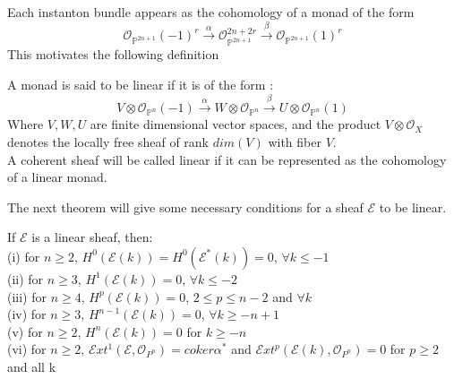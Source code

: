 \documentclass[
	oldfontcommands,
	sumario=abnt-6027-2012,
	12pt,			%
	openright,		%
	oneside,		%
	a4paper,		%
	english,		%
	brazil			%
	]{imecc-unicamp}
\begin{document}
Each instanton bundle appears as the cohomology of a monad of the form
\begin{equation}
\mathcal{O}_{\mathbb{P}^{2n+1}}(-1)^r \overset{ \alpha}{\to} \mathcal{O}_{\mathbb{P}^{2n+1}}^{2n+2r} \overset{ \beta}{\to}  \mathcal{O}_{\mathbb{P}^{2n+1}}(1)^r
\end{equation}
This motivates the following definition
\begin{definition}\cite[Jardim]{jardim}
A monad is said to be linear if it is of the form :
\begin{equation}
V \otimes \mathcal{O}_{\mathbb{P}^n}(-1) \overset{ \alpha}{\to} W \otimes \mathcal{O}_{\mathbb{P}^n} \overset{ \beta}{\to} U \otimes \mathcal{O}_{\mathbb{P}^n}(1)
\end{equation}
Where $V,W,U$ are finite dimensional vector spaces, and the product $V \otimes \mathcal{O}_X$ denotes the locally free sheaf of rank $dim(V)$ with fiber $V$. \\ 
A coherent sheaf will be called linear if it can be represented as the cohomology of a linear monad.
\end{definition}
The next theorem will give some necessary conditions for a sheaf $\mathcal{E}$ to be linear.

\begin{theorem}\label{jardim1}\cite[Jardim]{jardim}
If $\mathcal{E}$ is a linear sheaf, then: \\
(i) for $n \geq 2$, $H^0(\mathcal{E}(k))=H^0(\mathcal{E}^*(k))=0$, $\forall k \leq -1$ \\
(ii) for $n \geq 3$, $H^1(\mathcal{E}(k))=0$, $\forall k \leq -2$ \\
(iii) for $n \geq 4$, $H^p(\mathcal{E}(k))=0$, $2 \leq p \leq n-2$ and $\forall k$ \\
(iv) for $n \geq 3$, $H^{n-1}(\mathcal{E}(k))=0$, $\forall k \geq -n+1$ \\
(v) for $n \geq 2$, $H^n(\mathcal{E}(k))=0$ for $k \geq -n$ \\
(vi) for $n \geq 2$, $\mathcal{E}xt^1(\mathcal{E},\mathcal{O}_{P^n})=coker \alpha^*$ and $\mathcal{E}xt^p(\mathcal{E}(k),\mathcal{O}_{P^n})=0$ for $p \geq 2$ and all k
\end{theorem}
\end{document}
